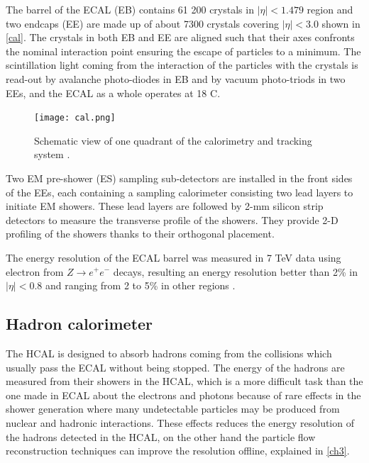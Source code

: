 The barrel of the ECAL (EB) contains 61 200 crystals in $|\eta|<1.479$ region and two endcaps (EE) are made up of about 7300 crystals covering $|\eta|<3.0$ shown in \autoref{cal}. The crystals in both EB and EE are aligned such that their axes confronts the nominal interaction point ensuring the escape of particles to a minimum. The scintillation light coming from the interaction of the particles with the crystals is read-out by avalanche photo-diodes in EB and by vacuum photo-triods in two EEs, and the ECAL as a whole operates at 18 \textdegree C.

\begin{figure}[ht]
	\centering
	\texttt{[image: cal.png]}
	\vspace{2mm}
	\caption[Schematic view showing one quadrant of the calorimetry and tracking system.]{Schematic view of one quadrant of the calorimetry and tracking system \cite{CERN-LHCC-97-033}.}
	\label{cal}
\end{figure}

Two EM pre-shower (ES) sampling sub-detectors are installed in the front sides of the EEs, each containing a sampling calorimeter consisting two lead layers to initiate EM showers. These lead layers are followed by 2-mm silicon strip detectors to measure the transverse profile of the showers. They provide 2-D profiling of the showers thanks to their orthogonal placement.

The energy resolution of the ECAL barrel was measured in 7 TeV data using electron from $Z \rightarrow e^+e^-$ decays, resulting an energy resolution better than 2\% in $|\eta|<0.8$ and ranging from 2 to 5\% in other regions \cite{ecalm}. 

\subsection{Hadron calorimeter}

The HCAL\cite{CMS:1997xji} is designed to absorb hadrons coming from the collisions which usually pass the ECAL without being stopped. The energy of the hadrons are measured from their showers in the HCAL, which is a more difficult task than the one made in ECAL about the electrons and photons because of rare effects in the shower generation where many undetectable particles may be produced from nuclear and hadronic interactions. These effects reduces the energy resolution of the hadrons detected in the HCAL, on the other hand the particle flow reconstruction techniques can improve the resolution offline, explained in \autoref{ch3}.

